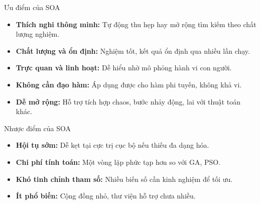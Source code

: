 \documentclass[10pt]{beamer}
\begin{document}
\begin{frame}{Ưu điểm của SOA}
\begin{itemize}
    \item \textbf{Thích nghi thông minh:} Tự động thu hẹp hay mở rộng tìm kiếm theo chất lượng nghiệm.
    \item \textbf{Chất lượng và ổn định:} Nghiệm tốt, kết quả ổn định qua nhiều lần chạy.
    \item \textbf{Trực quan và linh hoạt:} Dễ hiểu nhờ mô phỏng hành vi con người.
    \item \textbf{Không cần đạo hàm:} Áp dụng được cho hàm phi tuyến, không khả vi.
    \item \textbf{Dễ mở rộng:} Hỗ trợ tích hợp chaos, bước nhảy động, lai với thuật toán khác.
\end{itemize}
\end{frame}


\begin{frame}{Nhược điểm của SOA}
\begin{itemize}
    \item \textbf{Hội tụ sớm:} Dễ kẹt tại cực trị cục bộ nếu thiếu đa dạng hóa.
    \item \textbf{Chi phí tính toán:} Một vòng lặp phức tạp hơn so với GA, PSO.
    \item \textbf{Khó tinh chỉnh tham số:} Nhiều biến số cần kinh nghiệm để tối ưu.
    \item \textbf{Ít phổ biến:} Cộng đồng nhỏ, thư viện hỗ trợ chưa nhiều.
\end{itemize}
\end{frame}

\begin{frame}
    \nocite{*}
    \printbibliography
\end{frame}

\begin{frame}
    \begin{block}{}
    \medskip
    \center{\huge \it \textcolor[rgb]{0.37, 0.150, 0.190}{Thanks for listening!}}
    \medskip
    \end{block}	
\end{frame}    
\end{document}
